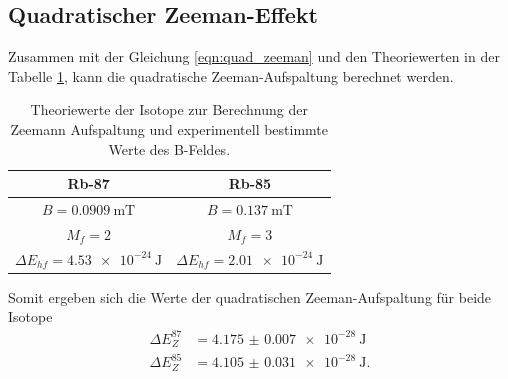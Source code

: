 \subsection{Quadratischer Zeeman-Effekt}
\label{sec:quadratischer-zeeman-effekt}

Zusammen mit der Gleichung \ref{eqn:quad_zeeman} und den Theoriewerten in der Tabelle \ref{tab:zee}, kann die
quadratische Zeeman-Aufspaltung berechnet werden.

\begin{table}
    \centering
    \caption{Theoriewerte der Isotope zur Berechnung der Zeemann Aufspaltung und experimentell bestimmte Werte des B-Feldes. \cite{pumpen}}
    \label{tab:zee}
    \begin{tabular}{c c}
        \toprule
        Rb-87 & Rb-85\\
        \midrule
        $B = \qty{0.0909}{\milli\tesla}$ & $B = \qty{0.137}{\milli\tesla}$ \\
        $M_f = 2$ & $M_f = 3$ \\
        $\Delta E_{hf} = \qty{4.53e-24}{\joule} $ & $\Delta E_{hf} = \qty{2.01e-24}{\joule} $ \\
        \bottomrule
    \end{tabular}
\end{table}

Somit ergeben sich die Werte der quadratischen Zeeman-Aufspaltung für beide Isotope
\begin{align}
    \Delta E_Z^{87} &= \qty{4.175(7)e-28}{\joule} \\
    \Delta E_Z^{85} &= \qty{4.105(31)e-28}{\joule} .
\end{align}